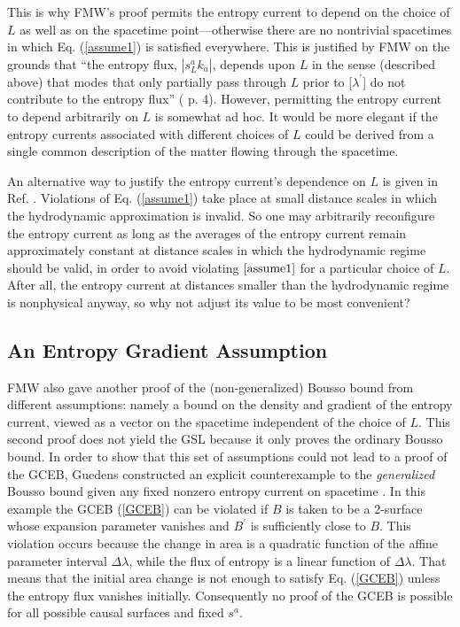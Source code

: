 \documentclass{article}
\begin{document}
This is why FMW's proof permits the entropy current to depend on the choice of $L$ as well as on the spacetime point---otherwise there are no nontrivial spacetimes in which Eq. (\ref{assume1}) is satisfied everywhere.  This is justified by FMW on the grounds that ``the entropy flux, $|s^{a}_{L}k_{a}|$, depends upon $L$ in the sense (described above) that modes that only partially pass through $L$ prior to [$\lambda^\prime$] do not contribute to the entropy flux'' (\cite{FMW00} p. 4).  However, permitting the entropy current to depend arbitrarily on $L$ is somewhat ad hoc.  It would be more elegant if the entropy currents associated with different choices of $L$ could be derived from a single common description of the matter flowing through the spacetime.

An alternative way to justify the entropy current's dependence on $L$ is given in Ref. \cite{BFM03}.  Violations of Eq. (\ref{assume1}) take place at small distance scales in which the hydrodynamic approximation is invalid.  So one may arbitrarily reconfigure the entropy current as long as the averages of the entropy current remain approximately constant at distance scales in which the hydrodynamic regime should be valid, in order to avoid violating $\ref{assume1}$ for a particular choice of $L$.  After all, the entropy current at distances smaller than the hydrodynamic regime is nonphysical anyway, so why not adjust its value to be most convenient?

\subsection{An Entropy Gradient Assumption}\label{BFM}

FMW also gave another proof of the (non-generalized) Bousso bound from different assumptions: namely a bound on the density and gradient of the entropy current, viewed as a vector on the spacetime independent of the choice of $L$.  This second proof does not yield the GSL because it only proves the ordinary Bousso bound.  In order to show that this set of assumptions could not lead to a proof of the GCEB, Guedens constructed an explicit counterexample to the \emph{generalized} Bousso bound given any fixed nonzero entropy current on spacetime \cite{guedens}.  In this example the GCEB (\ref{GCEB}) can be violated if $B$ is taken to be a 2-surface whose expansion parameter vanishes and $B^\prime$ is sufficiently close to $B$.  This violation occurs because the change in area is a quadratic function of the affine parameter interval $\Delta \lambda$, while the flux of entropy is a linear function of $\Delta \lambda$.  That means that the initial area change is not enough to satisfy Eq. (\ref{GCEB}) unless the entropy flux vanishes initially.  Consequently no proof of the GCEB is possible for all possible causal surfaces and fixed $s^a$.
\end{document}
